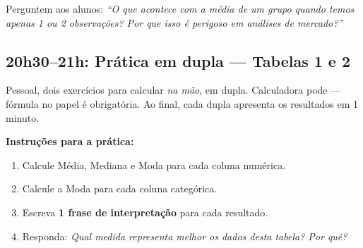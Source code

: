 Perguntem aos alunos: \textit{``O que acontece com a média de um grupo quando
temos apenas 1 ou 2 observações? Por que isso é perigoso em análises de mercado?''}

\subsection{20h30–21h: Prática em dupla — Tabelas 1 e 2}

Pessoal, dois exercícios para calcular \emph{na mão}, em dupla. Calculadora
pode — fórmula no papel é obrigatória. Ao final, cada dupla apresenta os
resultados em 1 minuto.

\begin{SolvedBox}
\textbf{Instruções para a prática:}
\begin{enumerate}
  \item Calcule Média, Mediana e Moda para cada coluna numérica.
  \item Calcule a Moda para cada coluna categórica.
  \item Escreva \textbf{1 frase de interpretação} para cada resultado.
  \item Responda: \emph{Qual medida representa melhor os dados desta tabela? Por quê?}
\end{enumerate}
\end{SolvedBox}


